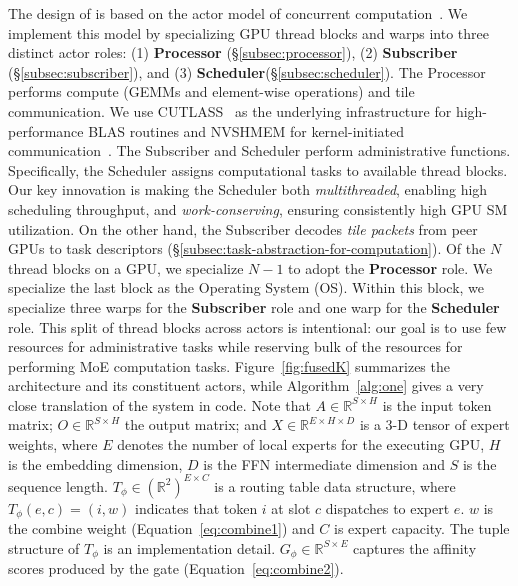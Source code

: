 The design of \sysname is based on the actor model of concurrent
computation~\cite{agha:85, 10.5555/1624775.1624804, Greif:75}.
We implement this model by specializing GPU thread blocks and warps into three distinct actor roles:
(1) \textbf{Processor} (\S\ref{subsec:processor}), (2) \textbf{Subscriber} (\S\ref{subsec:subscriber}),
and (3) \textbf{Scheduler}(\S\ref{subsec:scheduler}).
The Processor performs compute (GEMMs and element-wise operations) and tile communication.
We use CUTLASS~\cite{Thakkar_CUTLASS_2023} as the underlying infrastructure for high-performance
BLAS routines and NVSHMEM for kernel-initiated communication~\cite{nvshm}.
The Subscriber and Scheduler perform administrative functions.
Specifically, the Scheduler assigns computational tasks to available thread blocks.
Our key innovation is making the Scheduler both \emph{multithreaded},
enabling high scheduling throughput, and \emph{work-conserving}, ensuring consistently high GPU SM utilization.
On the other hand, the Subscriber decodes \emph{tile packets} from peer GPUs to task descriptors
(\S\ref{subsec:task-abstraction-for-computation}).
Of the $N$ thread blocks on a GPU, we specialize $N-1$ to adopt the \textbf{Processor} role.
We specialize the last block as the Operating System (OS).
Within this block, we specialize three warps for the \textbf{Subscriber} role and
one warp for the \textbf{Scheduler} role.
This split of thread blocks across actors is intentional: our goal is to use few resources for administrative
tasks while reserving bulk of the resources for performing MoE computation tasks.
Figure~\ref{fig:fusedK} summarizes the
\sysname architecture and its constituent actors, while Algorithm~\ref{alg:one} gives a very close translation of the
system in code.
Note that $A \in \mathbb{R}^{S \times H}$ is the input token matrix;
$O \in \mathbb{R}^{S \times H}$ the output matrix;
and $X \in \mathbb{R}^{E\times H \times D}$ is a 3-D tensor of expert weights,
where $E$ denotes the number of local experts for the executing GPU, $H$ is the embedding dimension,
$D$ is the FFN intermediate dimension and $S$ is the sequence length.
$T_{\phi} \in \left(\mathbb{R}^2\right)^{E \times C}$
is a routing table data structure, where $T_{\phi}\left( e, c\right) = (i, w)$ indicates that token $i$ at slot $c$
dispatches to expert $e$. $w$ is the combine weight (Equation~\ref{eq:combine1}) and $C$ is expert capacity.
The tuple structure of $T_{\phi}$ is an implementation detail. $G_{\phi} \in \mathbb{R}^{S \times E}$ captures
the affinity scores produced by the gate (Equation~\ref{eq:combine2}).
